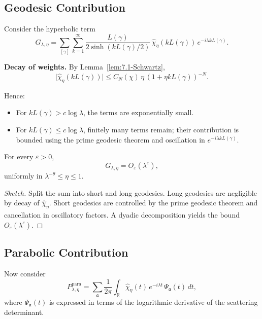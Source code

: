
\subsection{Geodesic Contribution}

Consider the hyperbolic term
\[
  G_{\lambda,\eta}
  = \sum_{[\gamma]} \sum_{k=1}^\infty
      \frac{L(\gamma)}{2\sinh(k L(\gamma)/2)}\,
      \widehat{\chi}_\eta(k L(\gamma))\,
      e^{-i \lambda k L(\gamma)}.
\]

\noindent\textbf{Decay of weights.}  
By Lemma~\ref{lem:7.1-Schwartz},
\[
  \big|\widehat{\chi}_\eta(k L(\gamma))\big|
  \le C_N(\chi)\,\eta\,(1+\eta k L(\gamma))^{-N}.
\]

Hence:
\begin{itemize}
  \item For $k L(\gamma) > c\log\lambda$, the terms are exponentially small.
  \item For $k L(\gamma) \le c\log\lambda$, finitely many terms remain; their contribution is bounded using the prime geodesic theorem and oscillation in $e^{-i \lambda k L(\gamma)}$.
\end{itemize}

\begin{proposition}\label{prop:7.7-geo}
For every $\varepsilon>0$,
\[
  G_{\lambda,\eta} = O_\varepsilon(\lambda^\varepsilon),
\]
uniformly in $\lambda^{-\theta}\le \eta\le 1$.
\end{proposition}

\begin{proof}[Sketch]
Split the sum into short and long geodesics.  
Long geodesics are negligible by decay of $\widehat{\chi}_\eta$.  
Short geodesics are controlled by the prime geodesic theorem and cancellation in oscillatory factors.  
A dyadic decomposition yields the bound $O_\varepsilon(\lambda^\varepsilon)$.
\end{proof}

\subsection{Parabolic Contribution}

Now consider
\[
  P_{\lambda,\eta}^{\mathrm{para}}
  = \sum_{\mathfrak{a}} \frac{1}{2\pi}
    \int_{\mathbb{R}} \widehat{\chi}_\eta(t)\,
    e^{-i\lambda t}\,\Psi_{\mathfrak{a}}(t)\, dt,
\]
where $\Psi_{\mathfrak{a}}(t)$ is expressed in terms of the logarithmic derivative of the scattering determinant.

